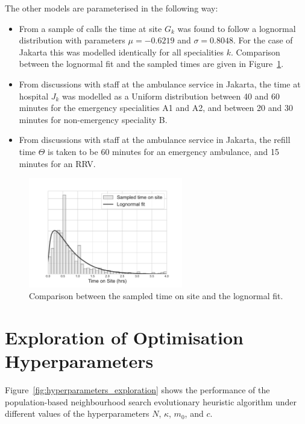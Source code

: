 \documentclass[preprint,12pt]{elsarticle}
\begin{document}
The other models are parameterised in the following way:
\begin{itemize}
  \item From a sample of calls the time at site $G_k$ was found to follow a
        lognormal distribution with parameters $\mu=-0.6219$ and $\sigma=0.8048$.
        For the case of Jakarta this was modelled identically for all
        specialities $k$. Comparison between the lognormal fit and the sampled
        times are given in Figure~\ref{fig:lognorm_fit}.
  \item From discussions with staff at the ambulance service in Jakarta, the
        time at hospital $J_k$ was modelled as a Uniform distribution between
        40 and 60 minutes for the emergency specialities A1 and A2, and
        between 20 and 30 minutes for non-emergency speciality B.
  \item From discussions with staff at the ambulance service in Jakarta, the
        refill time $\Theta$ is taken to be 60 minutes for an emergency
        ambulance, and 15 minutes for an RRV.
\end{itemize}

\begin{figure}[ht]
\centering
  \includegraphics[width=0.6\textwidth]{img/time_on_site_fit.pdf}
    \caption{Comparison between the sampled time on site and the lognormal
             fit.}
  \label{fig:lognorm_fit}
\end{figure}


\section{Exploration of Optimisation Hyperparameters}\label{apx:hyperparameters}
Figure~\ref{fig:hyperparameters_exploration} shows the performance of the
population-based neighbourhood search evolutionary heuristic algorithm under
different values of the hyperparameters $N$, $\kappa$, $m_0$, and $c$.
\end{document}
